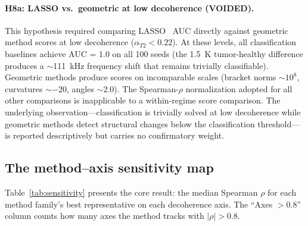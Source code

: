 \documentclass[11pt]{article}
\begin{document}
\paragraph{H8a: LASSO vs.\ geometric at low decoherence (VOIDED).}
\label{sec:deviation-h8a}
This hypothesis required comparing LASSO~\citep{tibshirani1996regression}
AUC directly against geometric method scores at low decoherence ($\alpha_{T2} < 0.22$).  At these
levels, all classification baselines achieve AUC = 1.0 on all 100 seeds
(the 1.5~K tumor-healthy difference produces a $\sim$111~kHz frequency
shift that remains trivially classifiable).  Geometric methods produce
scores on incomparable scales (bracket norms $\sim 10^8$, curvatures
$\sim -20$, angles $\sim 2.0$).  The Spearman-$\rho$ normalization
adopted for all other comparisons is inapplicable to a within-regime
score comparison.  The underlying observation---classification is
trivially solved at low decoherence while geometric methods detect
structural changes below the classification threshold---is reported
descriptively but carries no confirmatory weight.

\subsection{The method--axis sensitivity map}

Table~\ref{tab:sensitivity} presents the core result: the median
Spearman $\rho$ for each method family's best representative on each
decoherence axis.  The ``Axes $> 0.8$'' column counts how many axes
the method tracks with $|\rho| > 0.8$.
\end{document}
